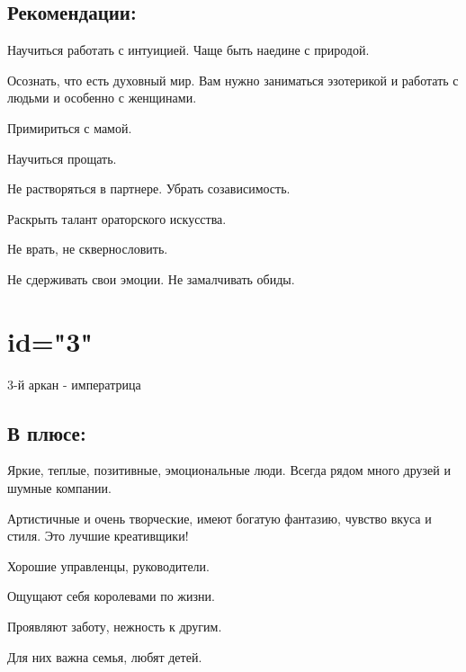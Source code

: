 \subsection{Рекомендации:}
\item Научиться работать с интуицией. Чаще быть наедине с природой.                                                 
\item Осознать, что есть духовный мир. Вам нужно заниматься эзотерикой и работать с людьми и особенно с женщинами. 
\item Примириться с мамой.                                                                                          
\item Научиться прощать.                                                                                            
\item Не растворяться в партнере. Убрать созависимость.                                                            
\item Раскрыть талант ораторского искусства.                                                                       
\item Не врать, не сквернословить.                                                                                 
\item Не сдерживать свои эмоции. Не замалчивать обиды.                                                              
\endsubsection

\endsection

\section{id="3"}{3-й аркан - императрица}

\subsection{В плюсе:}
\item Яркие, теплые, позитивные, эмоциональные люди. Всегда рядом много друзей и шумные компании.             
\item Артистичные и очень творческие, имеют богатую фантазию, чувство вкуса и стиля. Это лучшие креативщики! 
\item Хорошие управленцы, руководители.                                                                      
\item Ощущают себя королевами по жизни.                                                                      
\item Проявляют заботу, нежность к другим.                                                                   
\item Для них важна семья, любят детей.                                                                      

